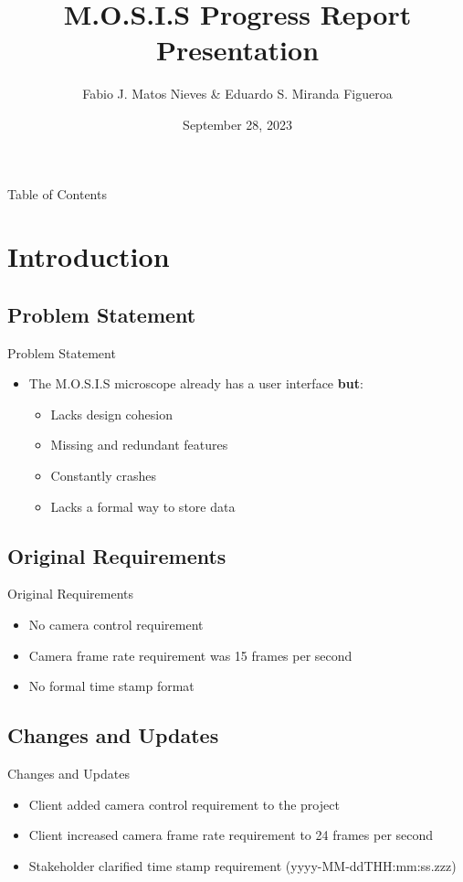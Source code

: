\documentclass[17pt, aspectratio=169]{beamer}
\title{M.O.S.I.S Progress Report Presentation}
\author[Fabio J. \& Eduardo S.]{Fabio J. Matos Nieves \& Eduardo S. Miranda Figueroa}
\institute[UPRM]{University of Puerto Rico Mayagüez Campus}
\date{September 28, 2023}
\begin{document}
\begin{frame}
	\maketitle
\end{frame}
\begin{frame}{Table of Contents}
	\begin{multicols}{2}
		\begin{spacing}{0.8}
			\tableofcontents
		\end{spacing}
	\end{multicols}
\end{frame}
\section{Introduction}
\subsection{Problem Statement}
\begin{frame}{Problem Statement}
	\begin{itemize}
		\item The M.O.S.I.S microscope already has a user interface \textbf{but}:
		      \begin{itemize}
			      \item Lacks design cohesion
			      \item Missing and redundant features
			      \item Constantly crashes
			      \item Lacks a formal way to store data
		      \end{itemize}
	\end{itemize}
\end{frame}
\subsection*{Original Requirements}
\begin{frame}{Original Requirements}
	\begin{itemize}
		\item No camera control requirement
		\item Camera frame rate requirement was 15 frames per second
		\item No formal time stamp format
	\end{itemize}
\end{frame}
\subsection*{Changes and Updates}
\begin{frame}{Changes and Updates}
	\begin{itemize}
		\item Client added camera control requirement to the project
		\item Client increased camera frame rate requirement to 24 frames per second
		\item Stakeholder clarified time stamp requirement (yyyy-MM-ddTHH:mm:ss.zzz)
	\end{itemize}
\end{frame}
\end{document}
